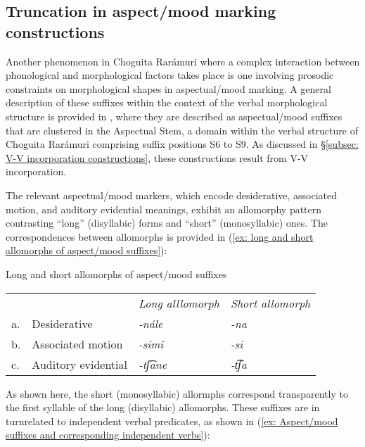 \subsection{Truncation in aspect/mood marking constructions}
\label{subsec: truncation in aspect/mood marking constructions}

Another phenomenon in Choguita Rarámuri where a complex interaction between phonological and morphological factors takes place is one involving prosodic constraints on morphological shapes in aspectual/mood marking. A general description of these suffixes within the context of the verbal morphological structure is provided in , where they are described as aspectual/mood suffixes that are clustered in the Aspectual Stem, a domain within the verbal structure of Choguita Rarámuri comprising suffix positions S6 to S9. As discussed in §\ref{subsec: V-V incorporation constructions}, these constructions result from V-V incorporation.


The relevant aspectual/mood markers, which encode desiderative, associated motion, and auditory evidential meanings, exhibit an allomorphy pattern contrasting ``long'' (disyllabic) forms and ``short'' (monosyllabic) ones. The correspondences between allomorphs is provided in (\ref{ex: long and short allomorphs of aspect/mood suffixes}):


\ea\label{ex: long and short allomorphs of aspect/mood suffixes}
{Long and short allomorphs of aspect/mood suffixes}

\begin{tabular}{llll}
        &  &\textit{Long alllomorph} & \textit{Short allomorph}\\
     a.& Desiderative &  \textit{-nále} & {\textit{-na}}\\
     b.& {Associated motion}& {\textit{-simi}}&{\textit{-si}}\\
     c.&{Auditory evidential} & {\textit{-tʃ͡ane} }&{\textit{-t͡ʃa}}\\
\end{tabular}
    \z

As shown here, the short (monosyllabic) allormphs correspond transparently to the first syllable of the long (disyllabic) allomorphs. These suffixes are in turnrelated to independent verbal predicates, as shown in (\ref{ex: Aspect/mood suffixes and corresponding independent verbs}):

